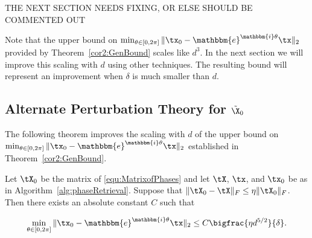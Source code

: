 {\color{red}THE NEXT SECTION NEEDS FIXING, OR ELSE SHOULD BE COMMENTED OUT}

Note that the upper bound on $\min_{\theta\in[0,2\pi]} \Vert \tx_0 - \mathbbm{e}^{\mathbbm{i}\theta}\tx \Vert_2$ provided by Theorem~\ref{cor2:GenBound} scales like $d^3$.  In the next section we will improve this scaling with $d$ using other techniques.  The resulting bound will represent an improvement when $\delta$ is much smaller than $d$.

\subsection{Alternate Perturbation Theory for $\tilde{\X}_0$}

The following theorem improves the scaling with $d$ of the upper bound on $\min_{\theta\in[0,2\pi]} \Vert \tx_0 - \mathbbm{e}^{\mathbbm{i}\theta}\tx \Vert_2$ established in Theorem~\ref{cor2:GenBound}.    %

\begin{thm}\label{thm:EB}  Let $\tX_0$ be the matrix of \eqref{equ:MatrixofPhases} and let $\tX$, $\tx$, and $\tx_0$ be as in Algorithm~\ref{alg:phaseRetrieval}.  Suppose that $\Vert \tX_0 - \tX \Vert_F \le \eta \Vert \tX_0 \Vert_F$.  Then there exists an absolute constant $C$ such that

  \[\min_{\theta\in[0,2\pi]} \Vert \tx_0 - \mathbbm{e}^{\mathbbm{i}\theta} \tx \Vert_2 \le C \bigfrac{\eta d^{5/2}}{\delta}.\]
\end{thm}


